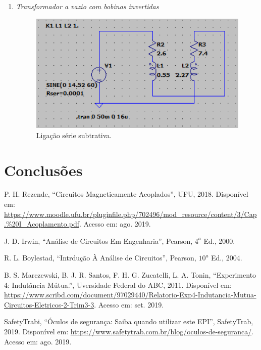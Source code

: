 \documentclass[a4paper,12pt,oneside,openany,table,xcdraw]{article}
\begin{document}
\begin{enumerate}
\item \emph{Transformador a vazio com bobinas invertidas}\\
\begin{figure}[H]
\centering
\captionsetup{font=scriptsize}
\includegraphics[width=11cm]{sim1}
\caption{Ligação série subtrativa.}
\label{aditiva}
\end{figure}

\end{enumerate}

\section{Conclusões} %


\newpage
\begin{thebibliography}{9} 
    P. H. Rezende,
    “Circuitos Magneticamente Acoplados”, UFU, 2018.
 Disponível em:
 \url{https://www.moodle.ufu.br/pluginfile.php/702496/mod_resource/content/3/Cap.\%20I_Acoplamento.pdf}. Acesso em: ago. 2019.

    J. D. Irwin,
    “Análise de Circuitos Em Engenharia”, Pearson, $4^a$ Ed., 2000.

    R. L. Boylestad,
    “Intrdução À Análise de Circuitos”, Pearson, $10^a$ Ed., 2004.

    B. S. Marczewski, B. J. R. Santos, F. H. G. Zucatelli, L. A. Tonin,
    “Experimento 4: Indutância Mútua.”, Uversidade Federal do ABC, 2011.
 Disponível em:
 \url{https://www.scribd.com/document/97029440/Relatorio-Exp4-Indutancia-Mutua-Circuitos-Eletricos-2-Trim3-3}. Acesso em: set. 2019.

    SafetyTrabi,
    “Óculos de segurança: Saiba quando utilizar este EPI”, SafetyTrab, 2019.
 Disponível em:
 \url{https://www.safetytrab.com.br/blog/oculos-de-seguranca/}. Acesso em: ago. 2019.


\end{thebibliography}
\end{document}
